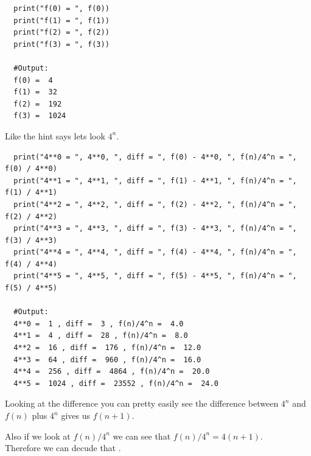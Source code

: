 \documentclass{article}
\begin{document}
\begin{enumerate}
\begin{enumerate}
\begin{lstlisting}
  print("f(0) = ", f(0))
  print("f(1) = ", f(1))
  print("f(2) = ", f(2))
  print("f(3) = ", f(3))

  #Output:
  f(0) =  4
  f(1) =  32
  f(2) =  192
  f(3) =  1024
      \end{lstlisting}

      Like the hint says lets look $4^n$. 

      \begin{lstlisting}
  print("4**0 = ", 4**0, ", diff = ", f(0) - 4**0, ", f(n)/4^n = ", f(0) / 4**0)
  print("4**1 = ", 4**1, ", diff = ", f(1) - 4**1, ", f(n)/4^n = ", f(1) / 4**1)
  print("4**2 = ", 4**2, ", diff = ", f(2) - 4**2, ", f(n)/4^n = ", f(2) / 4**2)
  print("4**3 = ", 4**3, ", diff = ", f(3) - 4**3, ", f(n)/4^n = ", f(3) / 4**3)
  print("4**4 = ", 4**4, ", diff = ", f(4) - 4**4, ", f(n)/4^n = ", f(4) / 4**4)
  print("4**5 = ", 4**5, ", diff = ", f(5) - 4**5, ", f(n)/4^n = ", f(5) / 4**5)

  #Output:
  4**0 =  1 , diff =  3 , f(n)/4^n =  4.0
  4**1 =  4 , diff =  28 , f(n)/4^n =  8.0
  4**2 =  16 , diff =  176 , f(n)/4^n =  12.0
  4**3 =  64 , diff =  960 , f(n)/4^n =  16.0
  4**4 =  256 , diff =  4864 , f(n)/4^n =  20.0
  4**5 =  1024 , diff =  23552 , f(n)/4^n =  24.0
      \end{lstlisting}

      Looking at the difference you can pretty easily see the difference between $4^n$ and $f(n)$ plus $4^n$ gives us $f(n + 1)$.
      
      Also if we look at $f(n) / 4^n$ we can see that $f(n) / 4^n = 4(n + 1)$.\\

      Therefore we can decude that .
      
    \end{enumerate}
  \end{enumerate}  
\end{document}
